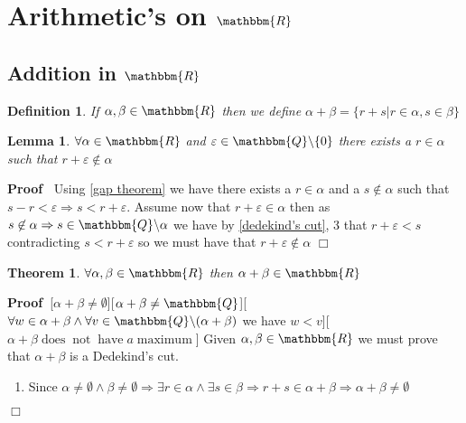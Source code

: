 \documentclass{book}
\newcommand{\nin}{\not\in}
\newcommand{\nobracket}{}
\newcommand{\tmop}[1]{\ensuremath{\operatorname{#1}}}
\newcommand{\um}{-}
\newcommand{\upl}{+}
\newenvironment{proof}{\noindent\textbf{Proof\ }}{\hspace*{\fill}$\Box$\medskip}
\newtheorem{definition}{Definition}
{\theorembodyfont{\rmfamily}\newtheorem{example}{Example}}
\newtheorem{lemma}{Lemma}
\newtheorem{theorem}{Theorem}
\begin{document}
{{\section{Arithmetic's on $\mathbbm{R}$}

\subsection{Addition in $\mathbbm{R}$}

\begin{definition}
  If $\alpha, \beta \in \mathbbm{R}$ then we define $\alpha \upl \beta = \{ r
  \upl s | r \in \alpha, s \in \beta \nobracket \}$
\end{definition}

\begin{lemma}
  \label{lemma for sum of reals}$\forall \alpha \in \mathbbm{R}$ and
  $\varepsilon \in \mathbbm{Q} \backslash \{ 0 \}$ there exists a $r \in
  \alpha$ such that $r \upl \varepsilon \nin \alpha$
\end{lemma}

\begin{proof}
  Using \ref{gap theorem} we have there exists a $r \in \alpha$ and a $s \nin
  \alpha$ such that $s \um r < \varepsilon \Rightarrow s < r \upl
  \varepsilon$. Assume now that $r \upl \varepsilon \in \alpha$ then as $s
  \nin \alpha \Rightarrow s \in \mathbbm{Q} \backslash \alpha$ we have by
  \ref{dedekind's cut}, 3 that $r \upl \varepsilon < s$ contradicting $s < r
  \upl \varepsilon$ so we must have that $r \upl \varepsilon \nin \alpha$
\end{proof}

\begin{theorem}
  $\forall \alpha, \beta \in \mathbbm{R}$ then $\alpha \upl \beta \in
  \mathbbm{R}$
\end{theorem}

\begin{proof}[$\alpha \upl \beta \neq \emptyset$][$\alpha \upl \beta \neq
\mathbbm{Q}$][$\forall w \in \alpha \upl \beta \wedge \forall v \in
\mathbbm{Q} \backslash (\alpha \upl \beta)$ we have $w < v$][$\alpha \upl
\beta \tmop{does} \tmop{not} \tmop{have} a \tmop{maximum}$]
  Given $\alpha, \beta \in \mathbbm{R}$ we must prove that $\alpha \upl \beta$
  is a Dedekind's cut.
  \begin{enumerate}
    \item Since $\alpha \neq \emptyset \wedge \beta \neq \emptyset \Rightarrow
    \exists r \in \alpha \wedge \exists s \in \beta \Rightarrow r \upl s \in
    \alpha \upl \beta \Rightarrow \alpha \upl \beta \neq \emptyset$
    

\end{enumerate}
\end{proof}}}
\end{document}
